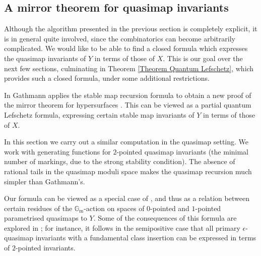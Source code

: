 \documentclass[11pt]{amsart}
\newcommand{\Gm}{\mathbb{G}_{\text{m}}}
\theoremstyle{definition}
\theoremstyle{definition}
\begin{document}
\subsection{A mirror theorem for quasimap invariants}
Although the algorithm presented in the previous section is completely explicit, it is in general quite involved, since the combinatorics can become arbitrarily complicated. We would like to be able to find a closed formula which expresses the quasimap invariants of $Y$ in terms of those of $X$. This is our goal over the next few sections, culminating in Theorem \ref{Theorem Quantum Lefschetz}, which provides such a closed formula, under some additional restrictions.

In \cite{Ga-MF} Gathmann applies the stable map recursion formula to obtain a new proof of the mirror theorem for hypersurfaces \cite{Givental-equivariantGW}. This can be viewed as a partial quantum Lefschetz formula, expressing certain stable map invariants of $Y$ in terms of those of $X$.

In this section we carry out a similar computation in the quasimap setting. We work with generating functions for $2$-pointed quasimap invariants (the minimal number of markings, due to the strong stability condition). The absence of rational tails in the quasimap moduli space makes the quasimap recursion much simpler than Gathmann's.

Our formula can be viewed as a special case of \cite[Corollary 5.5.1]{CF-K-wallcrossing}, and thus as a relation between certain residues of the $\Gm$-action on spaces of $0$-pointed and $1$-pointed parametrised quasimaps to $Y$. Some of the consequences of this formula are explored in \cite[Section 5.5]{CF-K-wallcrossing}; for instance, it follows in the semipositive case that all primary $\epsilon$-quasimap invariants with a fundamental class insertion can be expressed in terms of $2$-pointed invariants.
\end{document}
